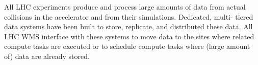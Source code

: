 All LHC experiments produce and process large amounts  of data from actual
collisions in the accelerator and from their simulations. Dedicated, multi-
tiered data systems have been built to store, replicate, and distributed these
data. All LHC WMS interface with these systems to move data to the sites where
related compute tasks are executed or to schedule compute tasks where (large
amount of) data are already stored.




